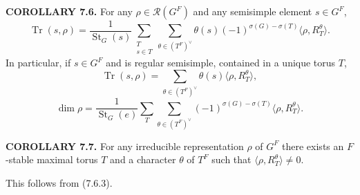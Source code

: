 \documentclass[9pt,twoside]{extarticle}
\begin{document}
{\noindent\textbf{COROLLARY 7.6.} For any \(\rho\in\mathcal R(G^F)\) and any semisimple element \(s\in G^F\), \[
\tag{7.6.1}
\operatorname{Tr}(s,\rho)
=\frac1{\operatorname{St}_G(s)}
\sum_{\substack{T\\s\in T}}
\sum_{\theta\in(T^F)^\vee}
\theta(s)(-1)^{\sigma(G)-\sigma(T)}\langle\rho,R_T^\theta\rangle.
\] In particular, if \(s\in G^F\) and is regular semisimple, contained in a unique torus \(T\), \[
\tag{7.6.2}
\operatorname{Tr}(s,\rho)=
\sum_{\theta\in(T^F)^\vee}\theta(s)\langle\rho,R_T^\theta\rangle,
\]  \[
\tag{7.6.3}
\dim\rho=
\frac1{\operatorname{St}_G(e)}
\sum_T\sum_{\theta\in(T^F)^\vee}
(-1)^{\sigma(G)-\sigma(T)}\langle\rho,R_T^\theta\rangle.
\]\par

\noindent\textbf{COROLLARY 7.7.} For any irreducible representation \(\rho\) of \(G^F\) there exists an \(F\)-stable maximal torus \(T\) and a character \(\theta\) of \(T^F\) such that \(\langle\rho,R_T^\theta\rangle\ne0\).\par

This follows from (7.6.3).\par
}
\end{document}
